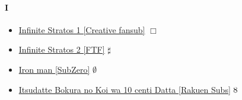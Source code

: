 \begin{itemize}
			\end{itemize}
		
		\paragraph{I} \hypertarget{SI}{}
			\begin{itemize}
				
				\item \href{https://mega.nz/#F!UzA1XbqL!zM05wN5_eRMqod9MhSzmvg} {Infinite Stratos 1 [Creative fansub]}  $\Box$ \\ 
				\item \href{https://mega.nz/#F!lioHBDgK!ZCdXRfYWc4BSMCybo0pDQw} {Infinite Stratos 2 [FTF]}  $\sharp$ \\ 
				\item \href{https://mega.nz/#F!EKA2yLZL!qULVphZdQb5zyXd986AlFQ} {Iron man [SubZero]}  $\emptyset$ \\ 
				\item \href{https://mega.nz/#F!P7hBxKaK!MtutGP-TO5Eey4aN2CfYnA} {Itsudatte Bokura no Koi wa 10 centi Datta [Rakuen Subs]}  $\oldstylenums{8}$ \\ 
			\end{itemize}	
		
